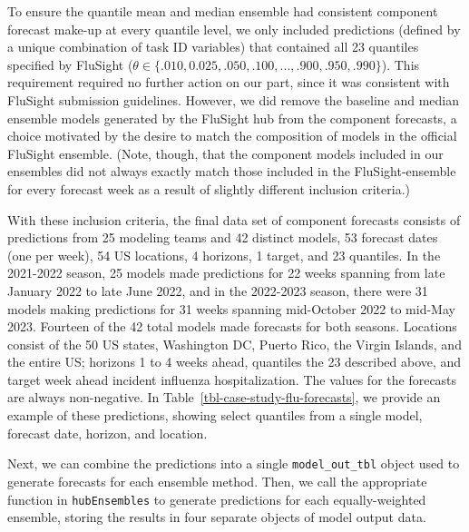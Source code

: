 \documentclass[
]{article}
\begin{document}
To ensure the quantile mean and median ensemble had consistent component
forecast make-up at every quantile level, we only included predictions
(defined by a unique combination of task ID variables) that contained
all 23 quantiles specified by FluSight
(\(\theta \in \{.010, 0.025, .050, .100, ..., .900, .950, .990\}\)).
This requirement required no further action on our part, since it was
consistent with FluSight submission guidelines. However, we did remove
the baseline and median ensemble models generated by the FluSight hub
from the component forecasts, a choice motivated by the desire to match
the composition of models in the official FluSight ensemble. (Note,
though, that the component models included in our ensembles did not
always exactly match those included in the FluSight-ensemble for every
forecast week as a result of slightly different inclusion criteria.)

With these inclusion criteria, the final data set of component forecasts
consists of predictions from 25 modeling teams and 42 distinct models,
53 forecast dates (one per week), 54 US locations, 4 horizons, 1 target,
and 23 quantiles. In the 2021-2022 season, 25 models made predictions
for 22 weeks spanning from late January 2022 to late June 2022, and in
the 2022-2023 season, there were 31 models making predictions for 31
weeks spanning mid-October 2022 to mid-May 2023. Fourteen of the 42
total models made forecasts for both seasons. Locations consist of the
50 US states, Washington DC, Puerto Rico, the Virgin Islands, and the
entire US; horizons 1 to 4 weeks ahead, quantiles the 23 described
above, and target week ahead incident influenza hospitalization. The
values for the forecasts are always non-negative. In
Table~\ref{tbl-case-study-flu-forecasts}, we provide an example of these
predictions, showing select quantiles from a single model, forecast
date, horizon, and location.

Next, we can combine the predictions into a single
\texttt{model\_out\_tbl} object used to generate forecasts for each
ensemble method. Then, we call the appropriate function in
\texttt{hubEnsembles} to generate predictions for each equally-weighted
ensemble, storing the results in four separate objects of model output
data.
\end{document}
